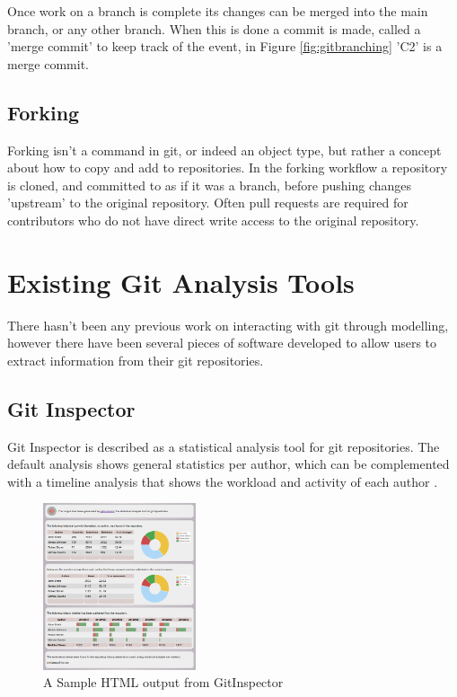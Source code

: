 \documentclass[11pt]{book}
\begin{document}
Once work on a branch is complete its changes can be merged into the main branch, or any other branch. When this is done a commit is made, called a 'merge commit' to keep track of the event, in Figure \ref{fig:gitbranching} 'C2' is a merge commit.

\subsection{Forking}
Forking isn't a command in git, or indeed an object type, but rather a concept about how to copy and add to repositories. In the forking workflow \cite{gitcomparingworkflows} a repository is cloned, and committed to as if it was a branch, before pushing changes 'upstream' to the original repository. Often pull requests are required for contributors who do not have direct write access to the original repository.

\section{Existing Git Analysis Tools}
There hasn't been any previous work on interacting with git through modelling, however there have been several pieces of software developed to allow users to extract information from their git repositories.

\subsection{Git Inspector}
Git Inspector is described as a statistical analysis tool for git repositories. The default analysis shows general statistics per author, which can be complemented with a timeline analysis that shows the workload and activity of each author \cite{gitinspector}.

\begin{figure}[h]
	\centering
	\includegraphics[width=0.4\textwidth]{images/gitinspector}
	\caption{A Sample HTML output from GitInspector \cite{gitinspector}}
	\label{fig:gitinspector}
\end{figure} 
\end{document}

